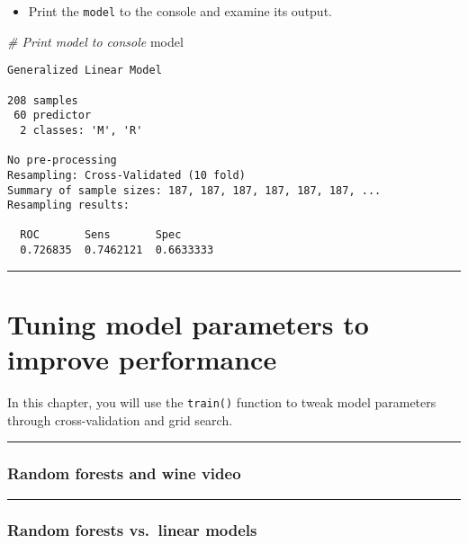 \documentclass[]{book}
\newenvironment{Shaded}{\begin{snugshade}}{\end{snugshade}}
\newcommand{\CommentTok}[1]{\textcolor[rgb]{0.56,0.35,0.01}{\textit{#1}}}
\newcommand{\NormalTok}[1]{#1}
\providecommand{\tightlist}{%
  \setlength{\itemsep}{0pt}\setlength{\parskip}{0pt}}
\begin{document}
\begin{itemize}
\tightlist
\item
  Print the \texttt{model} to the console and examine its output.
\end{itemize}

\begin{Shaded}
\begin{Highlighting}[]
\CommentTok{# Print model to console}
\NormalTok{model}
\end{Highlighting}
\end{Shaded}

\begin{verbatim}
Generalized Linear Model 

208 samples
 60 predictor
  2 classes: 'M', 'R' 

No pre-processing
Resampling: Cross-Validated (10 fold) 
Summary of sample sizes: 187, 187, 187, 187, 187, 187, ... 
Resampling results:

  ROC       Sens       Spec     
  0.726835  0.7462121  0.6633333
\end{verbatim}

\begin{center}\rule{0.5\linewidth}{\linethickness}\end{center}

\chapter{Tuning model parameters to improve
performance}\label{tuning-model-parameters-to-improve-performance}

In this chapter, you will use the \texttt{train()} function to tweak
model parameters through cross-validation and grid search.

\begin{center}\rule{0.5\linewidth}{\linethickness}\end{center}

\subsection*{Random forests and wine
video}\label{random-forests-and-wine-video}

\begin{center}\rule{0.5\linewidth}{\linethickness}\end{center}

\subsection*{Random forests vs.~linear
models}\label{random-forests-vs.linear-models}
\end{document}
